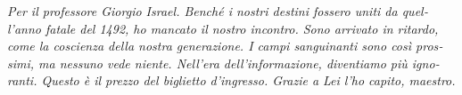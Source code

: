 \documentclass[paper=A4,portrait,twoside=true,twocolumn=true,headinclude=false,footinclude=false,fontsize=10,BCOR=15mm,DIV=13,pagesize=auto,titlepage=firstiscover,mpinclude=true,open=right,chapterprefix=true,numbers=autoendperiod,headsepline=false,parskip=false]{scrbook}
\theoremstyle{definition}
\begin{document}
\newpage 

\begin{FlushRight}
\begin{italian}
\textit{Per il professore Giorgio Israel. \newline Benché i nostri destini fossero uniti da quell'anno fatale del 1492, \linebreak ho mancato il nostro incontro. \linebreak Sono arrivato in ritardo, come la coscienza della nostra generazione. \linebreak I campi sanguinanti sono così prossimi, \linebreak ma nessuno vede niente. \linebreak Nell'era dell'informazione, diventiamo più ignoranti. \linebreak Questo è il prezzo del biglietto d'ingresso. \linebreak Grazie a Lei l'ho capito, maestro.}
\end{italian}
\end{FlushRight}

\newpage
\tableofcontents 

\frontmatter
\twocolumn
\pagestyle{plain}

\mainmatter
\pagestyle{scrheadings}
\end{document}
